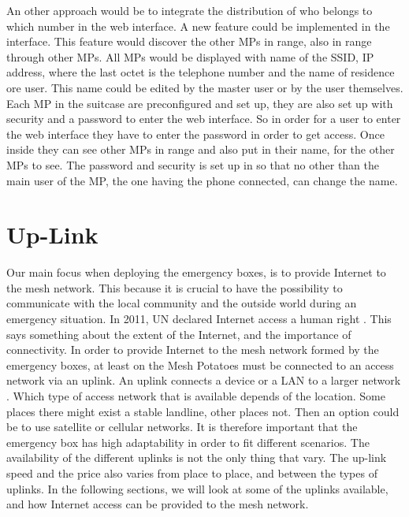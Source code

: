 An other approach would be to integrate the distribution of who belongs to which number in the web interface. A new feature could be implemented in the interface. This feature would discover the other MPs in range, also in range through other MPs. All MPs would be displayed with name of the SSID, IP address, where the last octet is the telephone number and the name of residence ore user. This name could be edited by the master user or by the user themselves. Each MP in the suitcase are preconfigured and set up, they are also set up with security and a password to enter the web interface. So in order for a user to enter the web interface they have to enter the password in order to get access. Once inside they can see other MPs in range and also put in their name, for the other MPs to see. The password and security is set up in so that no other than the main user of the MP, the one having the phone connected, can change the name. 

\section{Up-Link}
Our main focus when deploying the emergency boxes, is to provide Internet to the mesh network. This because it is crucial to have the possibility to communicate with the local community and the outside world during an emergency situation. In 2011, UN declared Internet access a human right \cite{HR}. This says something about the extent of the Internet, and the importance of connectivity. In order to provide Internet to the mesh network formed by the emergency boxes, at least on the Mesh Potatoes must be connected to an access network via an uplink. An uplink connects a device or a LAN to a larger network \cite{uplink}. Which type of access network that is available depends of the location. Some places there might exist a stable landline, other places not. Then an option could be to use satellite or cellular networks. It is therefore important that the emergency box has high adaptability in order to fit different scenarios. The availability of the different uplinks is not the only thing that vary. The up-link speed and the price also varies from place to place, and between the types of uplinks. In the following sections, we will look at some of the uplinks available, and how Internet access can be provided to the mesh network.  

